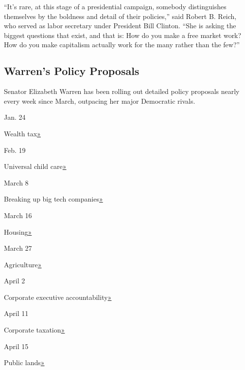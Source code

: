 ``It's rare, at this stage of a presidential campaign, somebody
distinguishes themselves by the boldness and detail of their policies,''
said Robert B. Reich, who served as labor secretary under President Bill
Clinton. ``She is asking the biggest questions that exist, and that is:
How do you make a free market work? How do you make capitalism actually
work for the many rather than the few?''

\hypertarget{warrens-policy-proposals}{%
\subsection{Warren's Policy Proposals}\label{warrens-policy-proposals}}

Senator Elizabeth Warren has been rolling out detailed policy proposals
nearly every week since March, outpacing her major Democratic rivals.

Jan. 24

Wealth tax\href{https://elizabethwarren.com/ultra-millionaire-tax/}{»}

Feb. 19

Universal child
care\href{https://medium.com/@teamwarren/my-plan-for-universal-child-care-762535e6c20a}{»}

March 8

Breaking up big tech
companies\href{https://medium.com/@teamwarren/heres-how-we-can-break-up-big-tech-9ad9e0da324c}{»}

March 16

Housing\href{https://medium.com/@teamwarren/my-housing-plan-for-america-20038e19dc26}{»}

March 27

Agriculture\href{https://medium.com/@teamwarren/leveling-the-playing-field-for-americas-family-farmers-823d1994f067}{»}

April 2

Corporate executive
accountability\href{https://www.washingtonpost.com/opinions/elizabeth-warren-its-time-to-scare-corporate-america-straight/2019/04/02/ca464ab0-5559-11e9-8ef3-fbd41a2ce4d5_story.html?utm_term=.d08b4f4b871f}{»}

April 11

Corporate
taxation\href{https://medium.com/@teamwarren/im-proposing-a-big-new-idea-the-real-corporate-profits-tax-29dde7c960d}{»}

April 15

Public
lands\href{https://medium.com/@teamwarren/my-plan-for-public-lands-e4be1d88a01c}{»}

